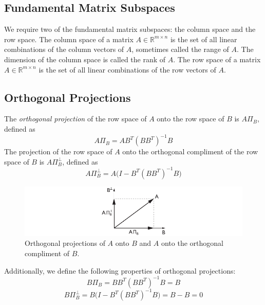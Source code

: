 \subsection{Fundamental Matrix Subspaces}
We require two of the fundamental matrix subspaces: the column space and the row space. The column space of a matrix $A \in \mathbb{R}^{m\times n}$ is the set of all linear combinations of the column vectors of $A$, sometimes called the range of $A$. The dimension of the column space is called the rank of $A$. The row space of a matrix $A \in \mathbb{R}^{m\times n}$ is the set of all linear combinations of the row vectors of $A$.


\subsection{Orthogonal Projections}
The \textit{orthogonal projection} of the row space of $A$ onto the row space of $B$ is $A\Pi_B$, defined as
\begin{equation*}
A\Pi_B = AB^T(BB^T)^{-1}B
\end{equation*}
The projection of the row space of $A$ onto the orthogonal compliment of the row space of $B$ is $A\Pi_B^\perp$, defined as
\begin{equation*}
A\Pi_B^\perp = A\big(I-B^T(BB^T)^{-1}B\big)
\end{equation*}
\begin{figure}[htb!]
	\centering
	\includegraphics{../fig/orthogonal_projection.pdf}
	\caption{Orthogonal projections of $A$ onto $B$ and $A$ onto the orthogonal compliment of $B$.}
\end{figure}

Additionally, we define the following properties of orthogonal projections:
\begin{equation*}
B\Pi_B = BB^T(BB^T)^{-1}B = B
\end{equation*}
\begin{equation*}
B\Pi_B^\perp = B\big(I-B^T(BB^T)^{-1}B\big) = B-B = 0
\end{equation*}

